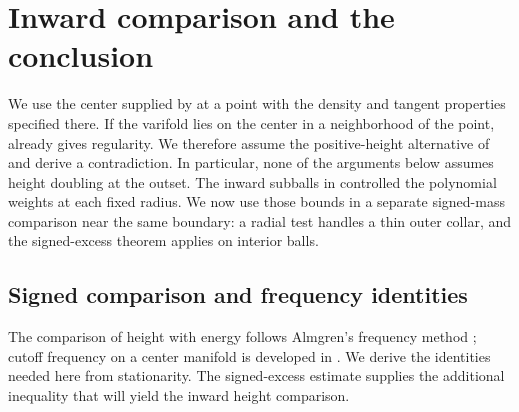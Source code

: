 \section{Inward comparison and the conclusion}\label{sec:inward}

We use the center supplied by  at a point
with the density and tangent properties specified there.  If the varifold
lies on the center in a neighborhood of the point, 
already gives regularity.  We therefore assume the positive-height
alternative of  and derive a contradiction.  In particular,
none of the arguments below assumes height doubling at the outset.
The inward subballs in  controlled the polynomial
weights at each fixed radius.  We now use those bounds in a separate
signed-mass comparison near the same boundary: a radial test handles a
thin outer collar, and the signed-excess theorem applies on interior balls.

\subsection{Signed comparison and frequency identities}

The comparison of height with energy follows Almgren's frequency method
\cite[Section~3.4]{DLS2011}; cutoff frequency on a center manifold is
developed in \cite[Section~3]{DLS2016III}. We derive the identities needed
here from stationarity. The signed-excess estimate supplies the additional
inequality that will yield the inward height comparison.

